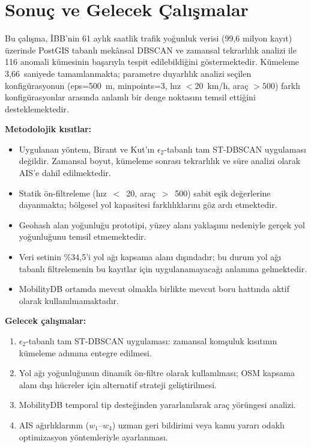 \documentclass[12pt,a4paper]{article}
\begin{document}
\section{Sonuç ve Gelecek Çalışmalar}

Bu çalışma, İBB'nin 61 aylık saatlik trafik yoğunluk verisi (99,6 milyon kayıt) üzerinde PostGIS tabanlı mekânsal DBSCAN ve zamansal tekrarlılık analizi ile 116 anomali kümesinin başarıyla tespit edilebildiğini göstermektedir. Kümeleme 3,66~saniyede tamamlanmakta; parametre duyarlılık analizi seçilen konfigürasyonun (eps=500~m, minpoints=3, hız $< 20$~km/h, araç $> 500$) farklı konfigürasyonlar arasında anlamlı bir denge noktasını temsil ettiğini desteklemektedir.

\textbf{Metodolojik kısıtlar:}

\begin{itemize}
    \item Uygulanan yöntem, Birant ve Kut'ın $\epsilon_2$-tabanlı tam ST-DBSCAN uygulaması değildir. Zamansal boyut, kümeleme sonrası tekrarlılık ve süre analizi olarak AIS'e dahil edilmektedir.
    \item Statik ön-filtreleme (hız~$<$~20, araç~$>$~500) sabit eşik değerlerine dayanmakta; bölgesel yol kapasitesi farklılıklarını göz ardı etmektedir.
    \item Geohash alan yoğunluğu prototipi, yüzey alanı yaklaşımı nedeniyle gerçek yol yoğunluğunu temsil etmemektedir.
    \item Veri setinin \%34,5'i yol ağı kapsama alanı dışındadır; bu durum yol ağı tabanlı filtrelemenin bu kayıtlar için uygulanamayacağı anlamına gelmektedir.
    \item MobilityDB ortamda mevcut olmakla birlikte mevcut boru hattında aktif olarak kullanılmamaktadır.
\end{itemize}

\textbf{Gelecek çalışmalar:}

\begin{enumerate}
    \item $\epsilon_2$-tabanlı tam ST-DBSCAN uygulaması: zamansal komşuluk kısıtının kümeleme adımına entegre edilmesi.
    \item Yol ağı yoğunluğunun dinamik ön-filtre olarak kullanılması; OSM kapsama alanı dışı hücreler için alternatif strateji geliştirilmesi.
    \item MobilityDB temporal tip desteğinden yararlanılarak araç yörüngesi analizi.
    \item AIS ağırlıklarının ($w_1$--$w_4$) uzman geri bildirimi veya kamu yararı odaklı optimizasyon yöntemleriyle ayarlanması.
\end{enumerate}
\end{document}

